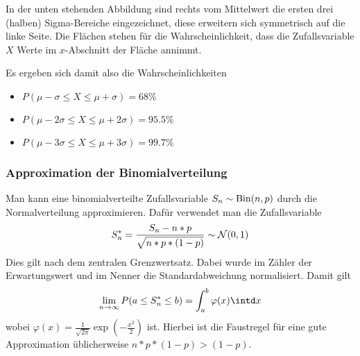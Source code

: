 In der unten stehenden Abbildung sind rechts vom Mittelwert die ersten drei (halben) Sigma-Bereiche eingezeichnet, diese erweitern sich symmetrisch auf die linke Seite. Die Flächen stehen für die Wahrscheinlichkeit, dass die Zufallsvariable $X$ Werte im $x$-Abschnitt der Fläche annimmt.
\begin{center}
\end{center}
Es ergeben sich damit also die Wahrscheinlichkeiten
\begin{itemize}
	\item $P(\mu-\sigma\leq X\leq \mu+\sigma)=68\%$
	\item $P(\mu-2\sigma\leq X\leq \mu+2\sigma)=95.5\%$
	\item $P(\mu-3\sigma\leq X\leq \mu+3\sigma)=99.7\%$
\end{itemize}



\subsubsection{Approximation der Binomialverteilung}
Man kann eine binomialverteilte Zufallsvariable $S_n\sim\operatorname{Bin}(n,p)$ durch die Normalverteilung approximieren. Dafür verwendet man die Zufallsvariable
\begin{equation*}
	S_n^\ast = \frac{S_n-n*p}{\sqrt{n*p*(1-p)}}\sim\mathcal{N}(0,1)
\end{equation*}
Dies gilt nach dem zentralen Grenzwertsatz. Dabei wurde im Zähler der Erwartungswert und im Nenner die Standardabweichung normalisiert.
Damit gilt
\begin{equation*}
	\lim_{n\to\infty} P(a\leq S_n^\ast \leq b)=\int_a^b \varphi(x)\intd x
\end{equation*}
wobei $\varphi(x)=\frac{1}{\sqrt{2\pi}} \exp(-\frac{x^2}{2})$ ist.
Hierbei ist die Faustregel für eine gute Approximation üblicherweise $n*p*(1-p)>(1-p)$.
\label{subsec:approximationderbinom}

